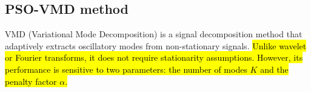 \documentclass[3p,authoryear,preprint,12pt]{elsarticle}
\begin{document}
%
%
%
\subsection{PSO-VMD method}

VMD (Variational Mode Decomposition) \citep{dragomiretskiyVariationalModeDecomposition2014} is a signal decomposition method that adaptively extracts oscillatory modes from non-stationary signals. \hl{Unlike wavelet or Fourier transforms, it does not require stationarity assumptions. However, its performance is sensitive to two parameters: the number of modes $K$ and the penalty factor $\alpha$.}
\end{document}
